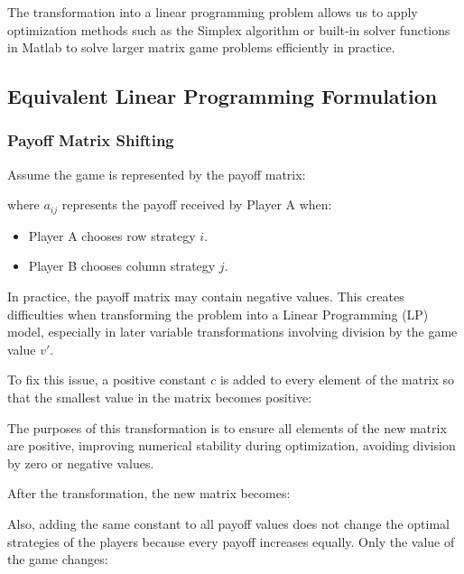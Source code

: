 \documentclass[12pt,a4paper]{article}
\begin{document}
The transformation into a linear programming problem allows us to apply optimization methods such as the Simplex algorithm or built-in solver functions in Matlab to solve larger matrix game problems efficiently in practice.

\subsection{Equivalent Linear Programming Formulation}

\subsubsection{Payoff Matrix Shifting}

Assume the game is represented by the payoff matrix:

\noindent{}

where  \(a_{ij}\) represents the payoff received by Player A when:

\begin{itemize}
    \item Player A chooses row strategy \(i\).
    \item Player B chooses column strategy \(j\).
\end{itemize}




In practice, the payoff matrix may contain negative values. This creates difficulties when transforming the problem into a Linear Programming (LP) model, especially in later variable transformations involving division by the game value \(v'\).

To fix this issue, a positive constant \(c\) is added to every element of the matrix so that the smallest value in the matrix becomes positive:

\noindent{}


The purposes of this transformation is to ensure all elements of the new matrix are positive, improving numerical stability during optimization, avoiding division by zero or negative values.

After the transformation, the new matrix becomes:


\noindent{}

Also, adding the same constant to all payoff values does not change the optimal strategies of the players because every payoff increases equally. Only the value of the game changes:
\end{document}
